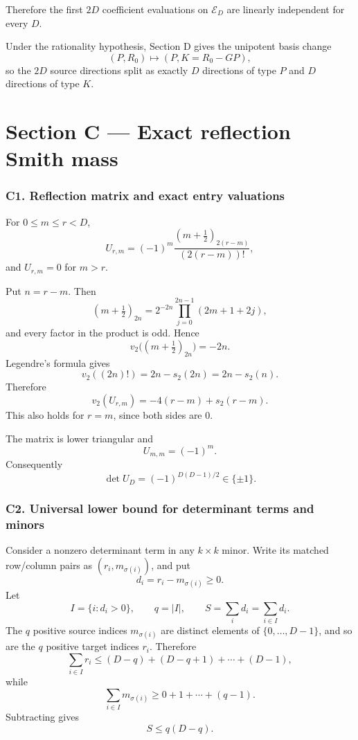 \documentclass[
  10pt,
  letterpaper,
]{article}
\theoremstyle{definition}
\theoremstyle{remark}
\begin{document}
Therefore the first \(2D\) coefficient evaluations on \(\mathcal E_D\)
are linearly independent for every \(D\).

Under the rationality hypothesis, Section D gives the unipotent basis
change \[
(P,R_0)\longmapsto(P,K=R_0-GP),
\] so the \(2D\) source directions split as exactly \(D\) directions of
type \(P\) and \(D\) directions of type \(K\).

\section{Section C --- Exact reflection Smith
mass}\label{section-c-exact-reflection-smith-mass}

\subsubsection{C1. Reflection matrix and exact entry
valuations}\label{c1.-reflection-matrix-and-exact-entry-valuations}

For \(0\le m\le r<D\), \[
U_{r,m}
=
(-1)^m\frac{(m+\frac12)_{2(r-m)}}{(2(r-m))!},
\] and \(U_{r,m}=0\) for \(m>r\).

Put \(n=r-m\). Then \[
(m+\tfrac12)_{2n}
=2^{-2n}\prod_{j=0}^{2n-1}(2m+1+2j),
\] and every factor in the product is odd. Hence \[
v_2\bigl((m+\tfrac12)_{2n}\bigr)=-2n.
\] Legendre's formula gives \[
v_2((2n)!)=2n-s_2(2n)=2n-s_2(n).
\] Therefore \[
\boxed{
v_2(U_{r,m})=-4(r-m)+s_2(r-m).
}
\] This also holds for \(r=m\), since both sides are \(0\).

The matrix is lower triangular and \[
U_{m,m}=(-1)^m.
\] Consequently \[
\boxed{
\det U_D=(-1)^{D(D-1)/2}\in\{\pm1\}.
}
\]

\subsubsection{C2. Universal lower bound for determinant terms and
minors}\label{c2.-universal-lower-bound-for-determinant-terms-and-minors}

Consider a nonzero determinant term in any \(k\times k\) minor. Write
its matched row/column pairs as \((r_i,m_{\sigma(i)})\), and put \[
d_i=r_i-m_{\sigma(i)}\ge0.
\] Let \[
I=\{i:d_i>0\},\qquad q=|I|,\qquad S=\sum_i d_i=\sum_{i\in I}d_i.
\] The \(q\) positive source indices \(m_{\sigma(i)}\) are distinct
elements of \(\{0,\ldots,D-1\}\), and so are the \(q\) positive target
indices \(r_i\). Therefore \[
\sum_{i\in I}r_i
\le (D-q)+(D-q+1)+\cdots+(D-1),
\] while \[
\sum_{i\in I}m_{\sigma(i)}
\ge 0+1+\cdots+(q-1).
\] Subtracting gives \[
\boxed{S\le q(D-q).}
\]
\end{document}
